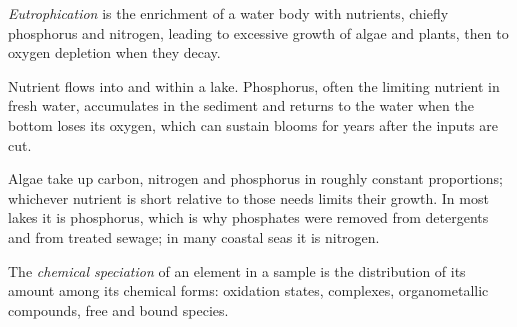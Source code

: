 \begin{definition}[Eutrophication]\label{def:b3:environmental-toxicology:eutrophication}
\emph{Eutrophication} is the enrichment of a water body
with nutrients, chiefly phosphorus and nitrogen, leading to excessive growth of
algae and plants, then to oxygen depletion when they decay.
\end{definition}

\begin{omfigure}

{\small Nutrient flows into and within a lake. Phosphorus, often the limiting
nutrient in fresh water, accumulates in the sediment and returns to the water
when the bottom loses its oxygen, which can sustain blooms for years after the
inputs are cut.}
\end{omfigure}

Algae take up carbon, nitrogen and phosphorus in roughly constant proportions;
whichever nutrient is short relative to those needs limits their growth. In
most lakes it is phosphorus, which is why phosphates were removed from
detergents and from treated sewage; in many coastal seas it is nitrogen.

\begin{definition}[Speciation]\label{def:b3:environmental-toxicology:speciation}
The \emph{chemical speciation} of an element in a
sample is the distribution of its amount among its chemical forms: oxidation
states, complexes, organometallic compounds, free and bound species.
\end{definition}

